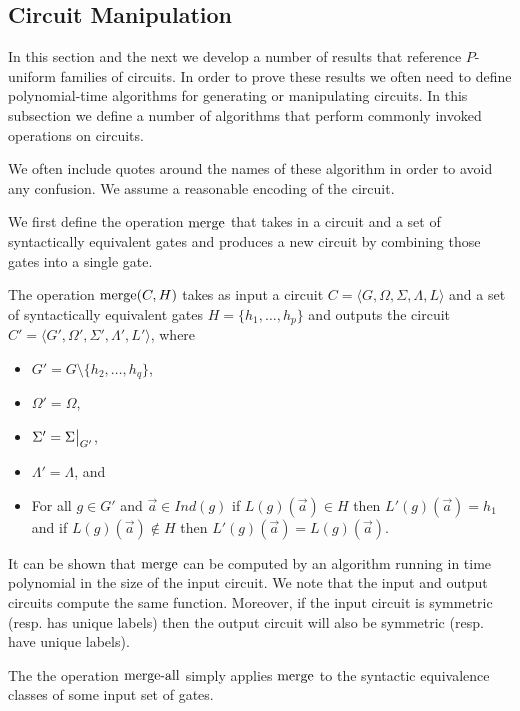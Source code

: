 \documentclass[../paper.tex]{subfiles}
\begin{document}
\subsection{Circuit Manipulation}
In this section and the next we develop a number of results that reference
$P$-uniform families of circuits. In order to prove these results we often need
to define polynomial-time algorithms for generating or manipulating circuits. In
this subsection we define a number of algorithms that perform commonly invoked
operations on circuits.

We often include quotes around the names of these algorithm in order to avoid
any confusion. We assume a reasonable encoding of the circuit.

We first define the operation $\text{\upshape merge}$ that takes in a circuit and a set of
syntactically equivalent gates and produces a new circuit by combining those
gates into a single gate.

\begin{definition}
  The operation $\text{\upshape merge}(C, H)$ takes as input a circuit $C = \langle G,
  \Omega, \Sigma , \Lambda, L \rangle$ and a set of syntactically equivalent
  gates $H = \{h_1, \ldots , h_p\}$ and outputs the circuit $C' = \langle G',
  \Omega', \Sigma', \Lambda', L' \rangle$, where
  \begin{itemize}
    \setlength\itemsep{0mm}
  \item $G' = G \setminus \{h_2, \ldots, h_q\}$,
  \item $\Omega' = \Omega$,
  \item $\Sigma' = \restr{\Sigma}{G'}$,
  \item $\Lambda' = \Lambda$, and
  \item For all $g \in G'$ and $\vec{a} \in Ind(g)$ if $L(g) (\vec{a}) \in H$
    then $L'(g)(\vec{a}) = h_1$ and if $L(g)(\vec{a}) \notin H$ then
    $L'(g)(\vec{a}) = L(g)(\vec{a})$.
  \end{itemize}
\end{definition}

It can be shown that $\text{\upshape merge}$ can be computed by an algorithm running in
time polynomial in the size of the input circuit. We note that the input and
output circuits compute the same function. Moreover, if the input circuit is
symmetric (resp. has unique labels) then the output circuit will also be
symmetric (resp. have unique labels).

The the operation $\text{\upshape merge-all}$ simply applies $\text{\upshape merge}$ to the syntactic
equivalence classes of some input set of gates.
\end{document}
